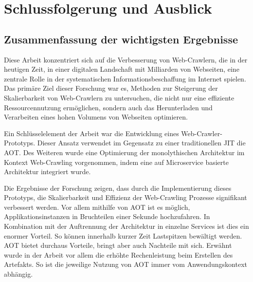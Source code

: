 \chapter{Schlussfolgerung und Ausblick}
\label{chap:conclusion}
\chapterstart

\section{Zusammenfassung der wichtigsten Ergebnisse}
Diese Arbeit konzentriert sich auf die Verbesserung von Web-Crawlern, die in der heutigen Zeit, in einer digitalen Landschaft mit Milliarden von Webseiten, eine zentrale Rolle in der systematischen Informationsbeschaffung im Internet spielen. Das primäre Ziel dieser Forschung war es, Methoden zur Steigerung der Skalierbarkeit von Web-Crawlern zu untersuchen, die nicht nur eine effiziente Ressourcennutzung ermöglichen, sondern auch das Herunterladen und Verarbeiten eines hohen Volumens von Webseiten optimieren.

Ein Schlüsselelement der Arbeit war die Entwicklung eines Web-Crawler-Prototyps. Dieser Ansatz verwendet im Gegensatz zu einer traditionellen \acl{JIT} die \acl{AOT}. Des Weiteren wurde eine Optimierung der monolythischen Architektur im Kontext Web-Crawling vorgenommen, indem eine auf Microservice basierte Architektur integriert wurde.

Die Ergebnisse der Forschung zeigen, dass durch die Implementierung dieses Prototyps, die Skalierbarkeit und Effizienz der Web-Crawling Prozesse signifikant verbessert werden. Vor allem mithilfe von \acl{AOT} ist es möglich, Applikationsinstanzen in Bruchteilen einer Sekunde hochzufahren. In Kombination mit der Auftrennung der Architektur in einzelne Services ist dies ein enormer Vorteil. So können innerhalb kurzer Zeit Lastspitzen bewältigt werden.
\newpage
\acl{AOT} bietet durchaus Vorteile, bringt aber auch Nachteile mit sich. Erwähnt wurde in der Arbeit vor allem die erhöhte Rechenleistung beim Erstellen des Artefakts. So ist die jeweilige Nutzung von \acl{AOT} immer vom Anwendungskontext abhängig.

